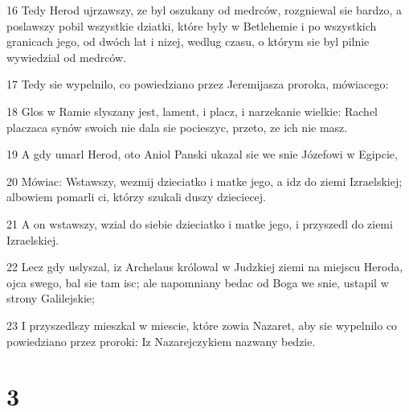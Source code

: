 \par 16 Tedy Herod ujrzawszy, ze byl oszukany od medrców, rozgniewal sie bardzo, a poslawszy pobil wszystkie dziatki, które byly w Betlehemie i po wszystkich granicach jego, od dwóch lat i nizej, wedlug czasu, o którym sie byl pilnie wywiedzial od medrców.
\par 17 Tedy sie wypelnilo, co powiedziano przez Jeremijasza proroka, mówiacego:
\par 18 Glos w Ramie slyszany jest, lament, i placz, i narzekanie wielkie: Rachel placzaca synów swoich nie dala sie pocieszyc, przeto, ze ich nie masz.
\par 19 A gdy umarl Herod, oto Aniol Panski ukazal sie we snie Józefowi w Egipcie,
\par 20 Mówiac: Wstawszy, wezmij dzieciatko i matke jego, a idz do ziemi Izraelskiej; albowiem pomarli ci, którzy szukali duszy dzieciecej.
\par 21 A on wstawszy, wzial do siebie dzieciatko i matke jego, i przyszedl do ziemi Izraelskiej.
\par 22 Lecz gdy uslyszal, iz Archelaus królowal w Judzkiej ziemi na miejscu Heroda, ojca swego, bal sie tam isc; ale napomniany bedac od Boga we snie, ustapil w strony Galilejskie;
\par 23 I przyszedlszy mieszkal w miescie, które zowia Nazaret, aby sie wypelnilo co powiedziano przez proroki: Iz Nazarejczykiem nazwany bedzie.

\chapter{3}

